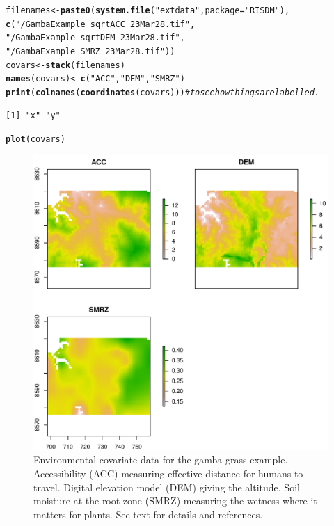\documentclass[article,shortnames,nojss]{jss}\usepackage[]{graphicx}\usepackage[]{xcolor}
\makeatletter
\def\maxwidth{ %
  \ifdim\Gin@nat@width>\linewidth
    \linewidth
  \else
    \Gin@nat@width
  \fi
}
\newcommand{\hlstr}[1]{\textcolor[rgb]{0.192,0.494,0.8}{#1}}%
\newcommand{\hlcom}[1]{\textcolor[rgb]{0.678,0.584,0.686}{\textit{#1}}}%
\newcommand{\hlstd}[1]{\textcolor[rgb]{0.345,0.345,0.345}{#1}}%
\newcommand{\hlkwb}[1]{\textcolor[rgb]{0.69,0.353,0.396}{#1}}%
\newcommand{\hlkwc}[1]{\textcolor[rgb]{0.333,0.667,0.333}{#1}}%
\newcommand{\hlkwd}[1]{\textcolor[rgb]{0.737,0.353,0.396}{\textbf{#1}}}%
\newenvironment{kframe}{%
 \def\at@end@of@kframe{}%
 \ifinner\ifhmode%
  \def\at@end@of@kframe{\end{minipage}}%
  \begin{minipage}{\columnwidth}%
 \fi\fi%
 \def\FrameCommand##1{\hskip\@totalleftmargin \hskip-\fboxsep
 \colorbox{shadecolor}{##1}\hskip-\fboxsep
     \hskip-\linewidth \hskip-\@totalleftmargin \hskip\columnwidth}%
 \MakeFramed {\advance\hsize-\width
   \@totalleftmargin\z@ \linewidth\hsize
   \@setminipage}}%
 {\par\unskip\endMakeFramed%
 \at@end@of@kframe}
\newenvironment{knitrout}{}{} %
\makeatother
\begin{document}
\begin{knitrout}
\color{fgcolor}\begin{kframe}
\begin{alltt}
\hlstd{filenames} \hlkwb{<-} \hlkwd{paste0}\hlstd{(} \hlkwd{system.file}\hlstd{(}\hlstr{"extdata"}\hlstd{,} \hlkwc{package}\hlstd{=}\hlstr{"RISDM"}\hlstd{),}
                   \hlkwd{c}\hlstd{(}\hlstr{"/GambaExample_sqrtACC_23Mar28.tif"}\hlstd{,}
                     \hlstr{"/GambaExample_sqrtDEM_23Mar28.tif"}\hlstd{,}
                     \hlstr{"/GambaExample_SMRZ_23Mar28.tif"}\hlstd{))}
\hlstd{covars} \hlkwb{<-} \hlkwd{stack}\hlstd{( filenames)}
\hlkwd{names}\hlstd{( covars)} \hlkwb{<-} \hlkwd{c}\hlstd{(}\hlstr{"ACC"}\hlstd{,}\hlstr{"DEM"}\hlstd{,}\hlstr{"SMRZ"}\hlstd{)}
\hlkwd{print}\hlstd{(} \hlkwd{colnames}\hlstd{(} \hlkwd{coordinates}\hlstd{( covars)))}  \hlcom{#to see how things are labelled.}
\end{alltt}
\begin{verbatim}
[1] "x" "y"
\end{verbatim}
\begin{alltt}
\hlkwd{plot}\hlstd{( covars)}
\end{alltt}
\end{kframe}\begin{figure}

{\centering \includegraphics[width=\maxwidth]{figure/readCovars-1} 

}

\caption[Environmental covariate data for the gamba grass example]{Environmental covariate data for the gamba grass example. Accessibility (ACC) measuring effective distance for humans to travel. Digital elevation model (DEM) giving the altitude. Soil moisture at the root zone (SMRZ) measuring the wetness where it matters for plants. See text for details and references.}\label{fig:readCovars}
\end{figure}

\end{knitrout}
\end{document}
